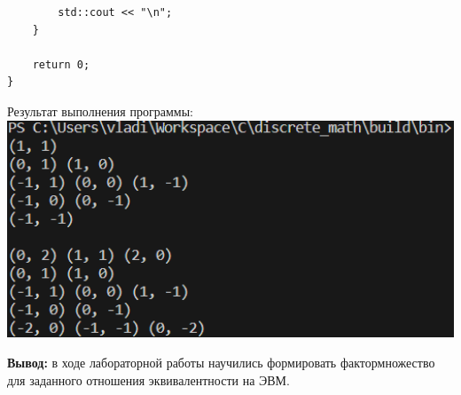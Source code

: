 \documentclass[a4paper,14pt]{extarticle}
\begin{document}
\begin{enumerate}[1.]
\begin{verbatim}
        std::cout << "\n";
    }

    return 0;
}
							\end{verbatim}
					Результат выполнения программы:\\
					\includegraphics[width=140mm]{task3}
\end{enumerate}

\textbf{Вывод: } в ходе лабораторной работы научились формировать фактормножество для заданного
отношения эквивалентности на ЭВМ.
\end{document}
